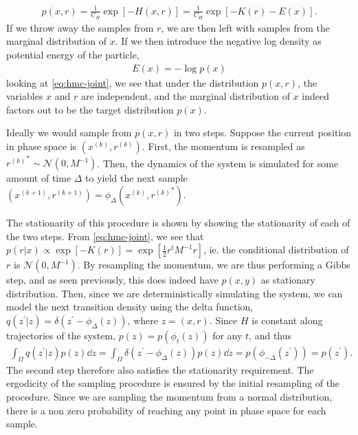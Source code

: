 \begin{align} \label{eq:hmc-joint}
    p(x, r) = \frac{1}{C_H} \exp\left[ -H(x, r)\right] = \frac{1}{C_H} \exp\left[-K(r) - E(x)  \right].
\end{align}
If we throw away the samples from $r$, we are then left with samples from the marginal distribution of $x$.
If we then introduce the negative log density as potential energy of the particle,
\begin{align*}
    E(x) = -\log{p(x)}
\end{align*}
looking at \cref{eq:hmc-joint}, we see that under the distribution $p(x, r)$, the variables $x$ and $r$ are independent, and the marginal distribution of $x$ indeed factors out to be the target distribution $p(x)$. 

\newcommand{\newx}{x^{\prime}}
\newcommand{\newr}{{r^{\prime}}}
\newcommand{\oldx}{{x^{(k)}}}
\newcommand{\oldr}{{r^{(k)}}}
\newcommand{\nextx}{x^{(k+1)}}
\newcommand{\nextr}{{r^{(k+1)}}}

Ideally we would sample from $p(x, r)$ in two steps.
Suppose the current position in phase space is $(\oldx, \oldr)$. 
First, the momentum is resampled as $\oldr^\ast\sim \mathcal{N}(0, M^{-1})$.
Then, the dynamics of the system is simulated for some amount of time $\Delta$ to yield the next sample $(\nextx, \nextr) =\phi_\Delta(\oldx, \oldr^\ast)$.

The stationarity of this procedure is shown by showing the stationarity of each of the two steps.
From \cref{eq:hmc-joint}, we see that $p(r|x) \propto \exp[-K(r)] = \exp[\frac{1}{2}r^tM^{-1}r]$, ie. the conditional distribution of $r$ is $\mathcal{N}(0, M^{-1})$.
By resampling the momentum, we are thus performing a Gibbs step, and as seen previously, this does indeed have $p(x, y)$ as stationary distribution.
Then, since we are deterministically simulating the system, we can model the next transition density using the delta function, $q(z^\prime|z) = \delta(z^\prime - \phi_\Delta(z))$, where $z=(x, r)$. 
Since $H$ is constant along trajectories of the system, $p(z) =p(\phi_t(z))$ for any $t$, and thus
\begin{align} \label{eq:}
    \int_{\Omega} q(z^\prime| z ) p(z) \dd{z} = \int_{\Omega} \delta(z^\prime - \phi_\Delta(z))p(z) \dd{z} 
    = p(\phi_{-\Delta}(z^\prime)) = p(z^\prime).
\end{align}
The second step therefore also satisfies the stationarity requirement.
The ergodicity of the sampling procedure is ensured by the initial resampling of the procedure.
Since we are sampling the momentum from a normal distribution, there is a non zero probability of reaching any point in phase space for each sample.

